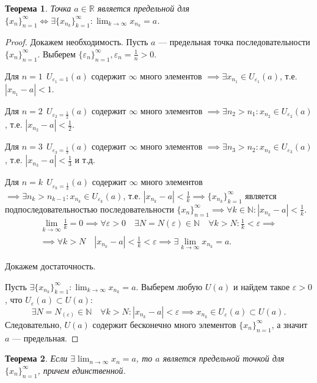 \documentclass[a4paper,12pt]{article} %
\newtheorem{theorem}{Теорема}[subsection]
\theoremstyle{remark}
\begin{document}
\begin{theorem}
	Точка $a\in \mathbb{R}$ является предельной для $\{x_n\}_{n=1}^{\infty} \iff \exists \{x_{n_k}\}_{k=1}^{\infty} : \lim_{k \to \infty} x_{n_k} = a$.
\end{theorem}
\begin{proof}
	Докажем необходимость. Пусть $a$ --- предельная точка последовательности $\{x_n\}_{n=1}^{\infty}$. Выберем $\{\varepsilon_n\}_{n=1}^{\infty}, \varepsilon_n = \frac{1}{n}>0$.

	Для $n=1 \ \ U_{\varepsilon_{1}=1}(a)$ содержит $\infty$ много элементов $\implies \exists x_{n_1}\in U_{\varepsilon_1}(a)$, т.е. $|x_{n_1}-a| < 1$.

	Для $n=2 \ \ U_{\varepsilon_{2}=\frac{1}{2}}(a)$ содержит $\infty$ много элементов $\implies \exists n_2>n_1 : x_{n_2}\in U_{\varepsilon_2}(a)$, т.е. $|x_{n_2}-a| < \frac{1}{2}$. 

	Для $n=3 \ \ U_{\varepsilon_{3}=\frac{1}{3}}(a)$ содержит $\infty$ много элементов $\implies \exists n_3>n_2 : x_{n_3}\in U_{\varepsilon_3}(a)$, т.е. $|x_{n_3}-a| < \frac{1}{3}$ и т.д. 

	Для $n=k \ \ U_{\varepsilon_{k}=\frac{1}{k}}(a)$ содержит $\infty$ много элементов $\implies \exists n_k>n_{k-1} : x_{n_k}\in U_{\varepsilon_k}(a)$, т.е. $|x_{n_k}-a| < \frac{1}{k} \implies \{x_{n_k}\}_{k=1}^{\infty}$ является подпоследовательностью последовательности $\{x_n\}_{n=1}^{\infty} \implies \forall k\in \mathbb{N} : |x_{n_k} - a| < \frac{1}{k}$.
	\begin{multline}
	\lim_{k \to \infty} \frac{1}{k} = 0 \implies \forall \varepsilon>0 \quad \exists N=N(\varepsilon)\in \mathbb{N} \quad \forall k>N : \frac{1}{k} < \varepsilon \implies \\
	\implies \forall k > N \quad |x_{n_k}-a| < \frac{1}{k} < \varepsilon \implies \exists \lim_{k \to \infty} x_{n_k} = a.
	\end{multline}

	Докажем достаточность.

	Пусть $\exists \{x_{n_k}\}_{k=1}^{\infty} : \lim_{k \to \infty} x_{n_k} = a$. Выберем любую $U(a)$ и найдем такое $\varepsilon>0$, что $U_\varepsilon(a) \subset  U(a)$:
	\[
	\exists N=N_(\varepsilon)\in\mathbb{N} \quad \forall k>N : |x_{n_k}-a|<\varepsilon \implies x_{n_k}\in U_\varepsilon(a)\subset U(a)
	.\]
Следовательно, $U(a)$ содержит бесконечно много элементов $\{x_n\}_{n=1}^{\infty}$, а значит $a$ --- предельная.
\end{proof}

\begin{theorem}
	Если $\exists \lim_{n \to \infty} x_n = a$, то $a$ является предельной точкой для $\{x_n\}_{n=1}^{\infty}$, причем единственной.
\end{theorem}
\end{document}
